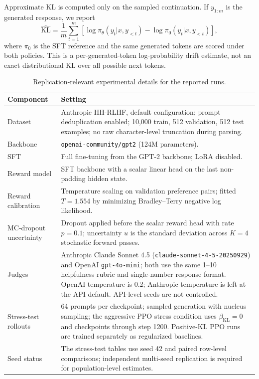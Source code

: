 \documentclass[twocolumn,10pt]{article}
\begin{document}
Approximate KL is computed only on the sampled continuation. If $y_{1:m}$ is the generated response, we report
\begin{equation}
    \widehat{\mathrm{KL}}=\frac{1}{m}\sum_{t=1}^{m}\left[\log\pi_\theta(y_t|x,y_{<t})-\log\pi_0(y_t|x,y_{<t})\right],
\end{equation}
where $\pi_0$ is the SFT reference and the same generated tokens are scored under both policies. This is a per-generated-token log-probability drift estimate, not an exact distributional KL over all possible next tokens.

\begin{table}[!tbp]
\centering
\tiny
\caption{Replication-relevant experimental details for the reported runs.}
\label{tab:replication_details}
\begin{tabular}{@{}p{}p{}@{}}
\toprule
Component & Setting \\
\midrule
Dataset & Anthropic HH-RLHF, default configuration; prompt deduplication enabled; 10,000 train, 512 validation, 512 test examples; no raw character-level truncation during parsing. \\
Backbone & \texttt{openai-community/gpt2} (124M parameters). \\
SFT & Full fine-tuning from the GPT-2 backbone; LoRA disabled. \\
Reward model & SFT backbone with a scalar linear head on the last non-padding hidden state. \\
Reward calibration & Temperature scaling on validation preference pairs; fitted $T=1.554$ by minimizing Bradley--Terry negative log likelihood. \\
MC-dropout uncertainty & Dropout applied before the scalar reward head with rate $p=0.1$; uncertainty $u$ is the standard deviation across $K=4$ stochastic forward passes. \\
Judges & Anthropic Claude Sonnet 4.5 (\texttt{claude-sonnet-4-5-20250929}) and OpenAI \texttt{gpt-4o-mini}; both use the same 1--10 helpfulness rubric and single-number response format. OpenAI temperature is 0.2; Anthropic temperature is left at the API default. API-level seeds are not controlled. \\
Stress-test rollouts & 64 prompts per checkpoint; sampled generation with nucleus sampling; the aggressive PPO stress condition uses $\beta_{\mathrm{KL}}=0$ and checkpoints through step 1200. Positive-KL PPO runs are trained separately as regularized baselines. \\
Seed status & The stress-test tables use seed 42 and paired row-level comparisons; independent multi-seed replication is required for population-level estimates. \\
\bottomrule
\end{tabular}
\end{table}
\end{document}
